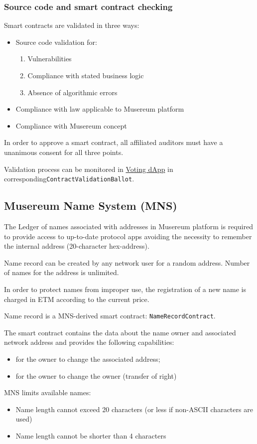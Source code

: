 \documentclass[12pt]{report}
\def\code#1{\colorbox{light-gray}{\texttt{#1}}}
\begin{document}
\subsubsection{Source code and smart contract checking}
\label{tech-apps-contracts-validate}
\begin{multicols}{2}
Smart contracts are validated in three ways:
\begin{itemize}
	\item Source code validation for:
		\begin{enumerate}
			\item Vulnerabilities 
			\item Compliance with stated business logic
			\item Absence of algorithmic errors
		\end{enumerate}
	\item Compliance with law applicable to Musereum platform
	\item Compliance with Musereum concept
\end{itemize}
\vfill\null
\columnbreak
In order to approve a smart contract, all affiliated auditors must have a unanimous consent for all three points.

Validation process can be monitored in \hyperref[tech-apps-voting]{Voting dApp} in corresponding\code{ContractValidationBallot}.
\end{multicols}
\subsection{Musereum Name System (MNS)}
\label{tech-apps-mns}
\begin{multicols}{2}
The Ledger of names associated with addresses in Musereum platform is required to provide access to up-to-date protocol apps avoiding the necessity to remember the internal address (20-character hex-address).

Name record can be created by any network user for a random address. Number of names for the address is unlimited.

In order to protect names from improper use, the registration of a new name is charged in ETM according to the current price.

Name record is a MNS-derived smart contract: \code{NameRecordContract}.

The smart contract contains the data about the name owner and associated network address and provides the following capabilities:
\begin{itemize}
	\item for the owner to change the associated address;
	\item for the owner to change the owner (transfer of right)
\end{itemize} 

MNS limits available names: 
\begin{itemize}
	\item Name length cannot exceed 20 characters (or less if non-ASCII characters are used) 
	\item Name length cannot be shorter than 4 characters
\end{itemize}
\end{multicols}
\end{document}

